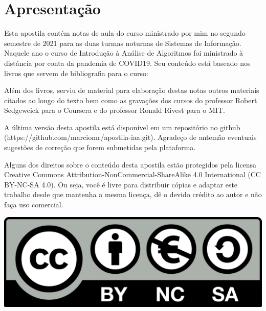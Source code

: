 \chapter*{Apresentação}

Esta apostila contém notas de aula do curso ministrado por mim no segundo semestre de 2021 para as duas turmas noturnas de Sistemas de Informação.
Naquele ano o curso de Introdução à Análise de Algoritmos foi ministrado à distância por conta da pandemia de COVID19.
Seu conteúdo está baseado nos livros que servem de bibliografia para o curso:

\nocite{sedgewick01,sedgewick11,cormen12}


\printbibliography[heading=none,keyword={bibliografia}]


  Além dos livros, serviu de material para elaboração destas notas outros materiais citados ao longo do texto bem como as gravações dos cursos do professor Robert Sedgeweick para o Coursera e do professor Ronald Rivest para o MIT.

  
  A última versão desta apostila está disponível em um repositório no github (https://github.com/marciomr/apostila-iaa.git).
  Agradeço de antemão eventuais sugestões de correção que forem submetidas pela plataforma.

  Alguns dos direitos sobre o conteúdo desta apostila estão protegidos pela licensa Creative Commons Attribution-NonCommercial-ShareAlike 4.0 International (CC BY-NC-SA 4.0).
Ou seja, você  é livre para distribuir cópias e adaptar este trabalho desde que mantenha a mesma licença, dê o devido crédito ao autor e não faça uso comercial.

\begin{center}
  \includegraphics[width=.3\textwidth]{imagens/cc.png}
\end{center}

